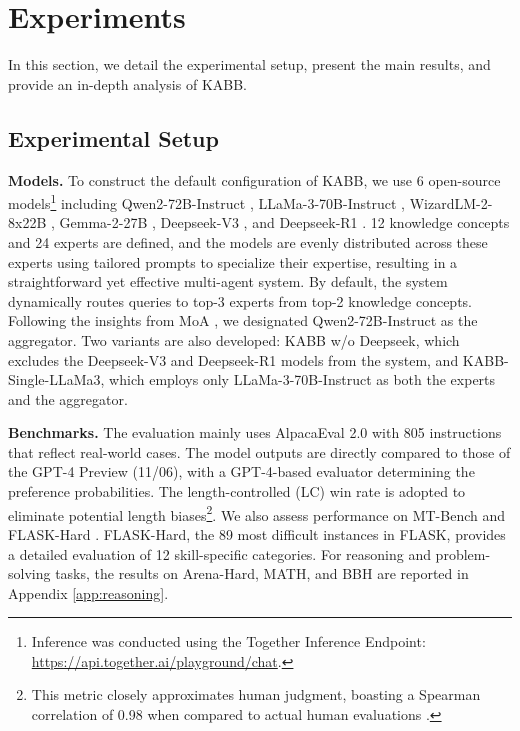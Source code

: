 \section{Experiments}

In this section, we detail the experimental setup, present the main results, and provide an in-depth analysis of KABB.

\subsection{Experimental Setup}
\label{sec:setup}
\textbf{Models.} To construct the default configuration of KABB, we use 6 open-source models\footnote{Inference was conducted using the Together Inference Endpoint: \href{https://api.together.ai/playground/chat}{https://api.together.ai/playground/chat}.} 
including Qwen2-72B-Instruct \cite{bai2023qwen}, LLaMa-3-70B-Instruct \cite{adams2024llama}, WizardLM-2-8x22B \cite{xu2024wizardlm}, Gemma-2-27B \cite{team2024gemma}, Deepseek-V3 \cite{liu2024deepseek}, and Deepseek-R1 \cite{guo2025deepseek}. 12 knowledge concepts and 24 experts are defined, and the models are evenly distributed across these experts using tailored prompts to specialize their expertise, resulting in a straightforward yet effective multi-agent system. By default, the system dynamically routes queries to top-3 experts from top-2 knowledge concepts. Following the insights from MoA \cite{wang2024mixture}, we designated Qwen2-72B-Instruct as the aggregator. Two variants are also developed: KABB w/o Deepseek, which excludes the Deepseek-V3 and Deepseek-R1 models from the system, and KABB-Single-LLaMa3, which employs only LLaMa-3-70B-Instruct as both the experts and the aggregator.

\textbf{Benchmarks.} The evaluation mainly uses AlpacaEval 2.0 \cite{dubois2024length} with 805 instructions that reflect real-world cases. The model outputs are directly compared to those of the GPT-4 Preview (11/06), with a GPT-4-based evaluator determining the preference probabilities. The length-controlled (LC) win rate is adopted to eliminate potential length biases\footnote{This metric closely approximates human judgment, boasting a Spearman correlation of 0.98 when compared to actual human evaluations \cite{dubois2024length}.}. We also assess performance on MT-Bench \cite{zheng2023judging} and FLASK-Hard \cite{ye2023flask}. FLASK-Hard, the 89 most difficult instances in FLASK, provides a detailed evaluation of 12 skill-specific categories. 
For reasoning and problem-solving tasks, the results on Arena-Hard, MATH, and BBH are reported in Appendix \ref{app:reasoning}.

